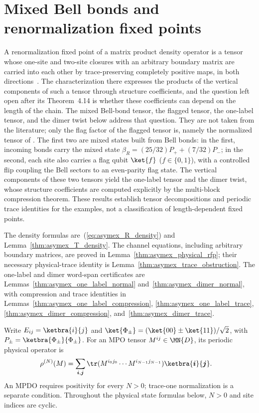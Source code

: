 \section{Mixed Bell bonds and renormalization fixed points}%
\label{sec:asymex_physical_models}

A renormalization fixed point of a matrix product density operator is a
tensor whose one-site and two-site closures with an arbitrary boundary
matrix are carried into each other by trace-preserving completely
positive maps, in both
directions~\cite[Definition~4.1, Example~4.12, Proposition~4.13,
    Theorem~4.14]{Cirac2016MPDO_arXiv}. The characterization there expresses
the products of the vertical components of such a tensor through
structure coefficients, and the question left open after its
Theorem~4.14 is whether these coefficients can depend on the length of
the chain. The mixed Bell-bond tensor, the flagged tensor, the one-label
tensor, and the dimer twist below address that question. They are not taken
from the literature; only the flag factor of the flagged tensor is, namely the
normalized tensor of \cite[Example~4.12]{Cirac2016MPDO_arXiv}. The first two are mixed states built
from Bell bonds: in the first, incoming bonds carry
the mixed state $\beta_R=(25/32)P_++(7/32)P_-$; in the second, each site also
carries a flag qubit $\ket{f}$ ($f\in\{0,1\}$), with a controlled flip coupling
the Bell sectors to an even-parity flag state. The vertical components
of these two tensors yield the one-label tensor and the dimer twist, whose
structure coefficients are computed explicitly by the multi-block compression
theorem. These results establish tensor decompositions and periodic trace
identities for the examples, not a classification of length-dependent fixed
points.

The density formulas are~(\ref{eq:asymex_R_density}) and
Lemma~\ref{thm:asymex_T_density}. The channel equations, including
arbitrary boundary matrices, are proved in
Lemma~\ref{thm:asymex_physical_rfp}; their necessary physical-trace
identity is Lemma~\ref{thm:asymex_trace_obstruction}. The one-label
and dimer word-span certificates are
Lemmas~\ref{thm:asymex_one_label_normal} and~\ref{thm:asymex_dimer_normal},
with compression and trace identities in
Lemmas~\ref{thm:asymex_one_label_compression},
\ref{thm:asymex_one_label_trace}, \ref{thm:asymex_dimer_compression},
and~\ref{thm:asymex_dimer_trace}.

Write $E_{ij}=\ketbra{i}{j}$ and
$\ket{\Phi_\pm}=(\ket{00}\pm\ket{11})/\sqrt2$, with
$P_\pm=\ketbra{\Phi_\pm}{\Phi_\pm}$.
For an MPO tensor $M^{ij}\in\MN{D}$, its periodic physical operator is
\begin{align}
    \rho^{(N)}(M)
     & =\sum_{\boldsymbol i,\boldsymbol j}
    \tr(M^{i_0j_0}\cdots M^{i_{N-1}j_{N-1}})
    \ketbra{\boldsymbol i}{\boldsymbol j}.
    \label{eq:asymex_physical_closure}
\end{align}
An MPDO requires positivity for every $N>0$; trace-one normalization is a
separate condition. Throughout the physical state formulas below, $N>0$
and site indices are cyclic.

